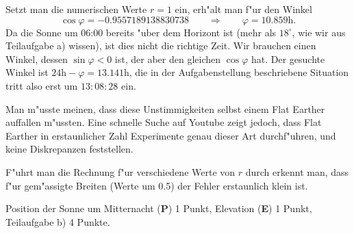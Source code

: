\begin{loesung}
\begin{teilaufgaben}
Setzt man die numerischen Werte $r=1$ ein, erh"alt man f"ur
den Winkel
\[
\cos\varphi= -0.9557189138830738
\qquad\Rightarrow\qquad
\varphi = 10.859\text{h}.
\]
Da die Sonne um 06:00 bereits "uber dem Horizont ist (mehr als $18^\circ$,
wie wir aus Teilaufgabe a) wissen), ist dies nicht die richtige Zeit.
Wir brauchen einen Winkel, dessen $\sin\varphi<0$ ist, der aber
den gleichen $\cos\varphi$ hat.
Der gesuchte Winkel ist $24\text{h}-\varphi=13.141\text{h}$, die
in der Aufgabenstellung beschriebene Situation tritt also erst um
$13:08:28$ ein. 
\end{teilaufgaben}
Man m"usste meinen, dass diese Unstimmigkeiten selbst einem Flat Earther 
auffallen m"ussten.
Eine schnelle Suche auf Youtube zeigt jedoch, dass Flat Earther in
erstaunlicher Zahl Experimente genau dieser Art durchf"uhren, und keine
Diskrepanzen feststellen.

F"uhrt man die Rechnung f"ur verschiedene Werte von $r$ durch erkennt man,
dass f"ur gem"assigte Breiten (Werte um 0.5) der Fehler erstaunlich klein
ist.
\end{loesung}


\begin{bewertung}
Position der Sonne um Mitternacht ({\bf P}) 1 Punkt,
Elevation ({\bf E}) 1 Punkt,
Teilaufgabe b) 4 Punkte.
\end{bewertung}

